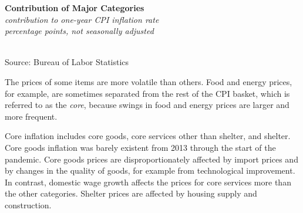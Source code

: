 \documentclass{report}
\newcommand{\tbllink}[1]{\href{https://raw.githubusercontent.com/bdecon/US-chartbook/master/chartbook/data/#1}{\faTable}}
\newcommand{\barylab}[2]{yticklabel style={text width=#1, align=right, 
		style={black!70}, text height=#2},}
\newcommand{\bbar}[2]{extra #1 ticks = {{#2}}, extra #1 tick labels = ,
		extra #1 tick style = {grid=major, grid style={thick, black!25}},}
\newcommand{\barplotnogrid}{xbar=0pt, axis line style={draw=none},
	    yticklabel style={align=left, anchor=east},
      		xmajorticks=false, ymajorgrids=false,   
	    ytick=data, tickwidth=0pt, area legend, reverse legend,
	    nodes near coords align={horizontal},}
\begin{document}
{\begin{minipage}{0.32\textwidth}
\small 
\end{minipage} \hspace{6mm}
\begin{minipage}{0.39\textwidth}
\normalsize \textbf{Contribution of Major Categories}\\
\footnotesize{\textit{contribution to one-year CPI inflation rate}}\\
\footnotesize{\textit{percentage points, not seasonally adjusted}}\\
\hspace*{-3mm} \\
\footnotesize{Source: Bureau of Labor Statistics} \hfill \tbllink{cpi_comp.csv}
\end{minipage}
\newpage
\vspace*{-6mm}
\begin{minipage}{1.0\textwidth}
\small The prices of some items are more volatile than others. Food and energy prices, for example, are sometimes separated from the rest of the CPI basket, which is referred to as the \textit{core}, because swings in food and energy prices are larger and more frequent. 

Core inflation includes core goods, core services other than shelter, and shelter. Core goods inflation was barely existent from 2013 through the start of the pandemic. Core goods prices are disproportionately affected by import prices and by changes in the quality of goods, for example from technological improvement. In contrast, domestic wage growth affects the prices for core services more than the other categories. Shelter prices are affected by housing supply and construction. 


\end{minipage}}
\end{document}
